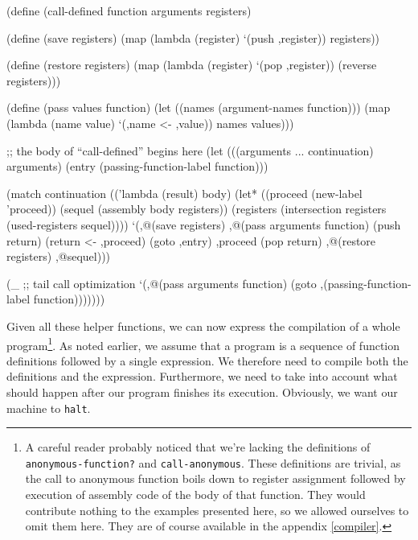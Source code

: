 \begin{Snippet}
    (define (call-defined function arguments registers)
\end{Snippet}
\begin{Snippet}
      (define (save registers)
        (map (lambda (register)
               `(push ,register))
             registers))
\end{Snippet}
\begin{Snippet}
      (define (restore registers)
        (map (lambda (register)
               `(pop ,register))
             (reverse registers)))
\end{Snippet}
\begin{Snippet}
      (define (pass values function)
        (let ((names (argument-names function)))
          (map (lambda (name value)
                 `(,name <- ,value))
               names values)))
\end{Snippet}
\begin{Snippet}
      ;; the body of ``call-defined'' begins here
      (let (((arguments ... continuation) arguments)
            (entry (passing-function-label function)))
\end{Snippet}
\begin{Snippet}
        (match continuation
          (('lambda (result) body)
           (let* ((proceed (new-label 'proceed))
                  (sequel (assembly body registers))
                  (registers (intersection registers
                                  (used-registers sequel))))
             `(,@(save registers)
               ,@(pass arguments function)
	       (push return)
	       (return <- ,proceed)
               (goto ,entry)
               ,proceed
	       (pop return)
               ,@(restore registers)
               ,@sequel)))
\end{Snippet}
\begin{Snippet}
          (_ ;; tail call optimization
           `(,@(pass arguments function)
	     (goto ,(passing-function-label function)))))))
\end{Snippet}

Given all these helper functions, we can now express the
compilation of a whole program\footnote{
  A careful reader probably noticed that we're lacking
  the definitions of \texttt{anonymous-function?} and
  \texttt{call-anonymous}. These definitions are trivial,
  as the call to anonymous function boils down to register
  assignment followed by execution of assembly code of the
  body of that function. They would contribute nothing
  to the examples presented here, so we allowed ourselves
  to omit them here. They are of course available in the
  appendix \ref{compiler}.
}. As noted earlier, we assume
that a program is a sequence of function definitions followed
by a single expression. We therefore need to compile both the
definitions and the expression. Furthermore, we need to
take into account what should happen after our program finishes
its execution. Obviously, we want our machine to \texttt{halt}.

